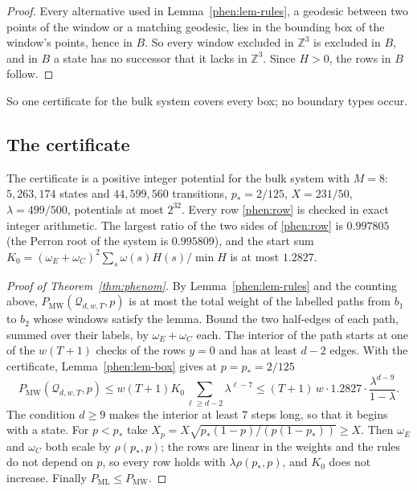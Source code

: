 \documentclass[11pt]{amsart}
\theoremstyle{definition}
\theoremstyle{remark}
\numberwithin{equation}{section}
\newcommand{\PML}{P_{\mathrm{ML}}}
\newcommand{\PMW}{P_{\mathrm{MW}}}
\begin{document}
\begin{proof}
Every alternative used in Lemma~\ref{phen:lem-rules}, a geodesic between two points of the window or a matching
geodesic, lies in the bounding box of the window's points, hence in $B$. So every window excluded in $\mathbb Z^3$ is
excluded in $B$, and in $B$ a state has no successor that it lacks in $\mathbb Z^3$. Since $H>0$, the rows in $B$
follow.
\end{proof}

So one certificate for the bulk system covers every box; no boundary types occur.

\subsection{The certificate}\label{phen:cert}
The certificate is a positive integer potential for the bulk system with $M=8$: $5{,}263{,}174$ states and
$44{,}599{,}560$ transitions, $p_\ast=2/125$, $X=231/50$, $\lambda=499/500$, potentials at most $2^{32}$. Every row
\eqref{phen:row} is checked in exact integer arithmetic. The largest ratio of the two sides of \eqref{phen:row} is
$0.997805$ (the Perron root of the system is $0.995809$), and the start sum
$K_0=(\omega_E+\omega_C)^2\sum_s\omega(s)H(s)/\min H$ is at most $1.2827$.

\begin{proof}[Proof of Theorem~\ref{thm:phenom}]
By Lemma~\ref{phen:lem-rules} and the counting above, $\PMW(\mathcal Q_{d,w,T},p)$ is at most the total weight of
the labelled paths from $b_1$ to $b_2$ whose windows satisfy the lemma. Bound the two half-edges of each path, summed
over their labels, by $\omega_E+\omega_C$ each. The interior of the path starts at one of the $w(T+1)$ checks of the
rows $y=0$ and has at least $d-2$ edges. With the certificate, Lemma~\ref{phen:lem-box} gives at $p=p_\ast=2/125$
\[
  \PMW(\mathcal Q_{d,w,T},p)\le w(T+1)K_0\sum_{\ell\ge d-2}\lambda^{\ell-7}\le(T+1)\,w\cdot1.2827\cdot
  \frac{\lambda^{d-9}}{1-\lambda}.
\]
The condition $d\ge9$ makes the interior at least $7$ steps long, so that it begins with a state. For $p<p_\ast$ take $X_p=X\sqrt{p_\ast(1-p)/(p(1-p_\ast))}\ge X$. Then $\omega_E$ and $\omega_C$ both scale by
$\rho(p_\ast,p)$; the rows are linear in the weights and the rules do not depend on $p$, so every row holds with
$\lambda\rho(p_\ast,p)$, and $K_0$ does not increase. Finally $\PML\le\PMW$.
\end{proof}
\end{document}
